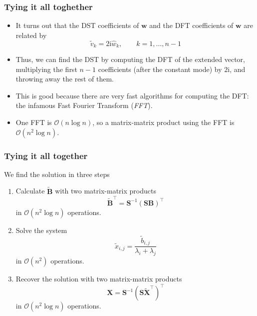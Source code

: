 \begin{frame}
  \frametitle{Tying it all toghether}
  \begin{itemize}
  \item It turns out that the DST coefficients of $\bm w$ and the DFT
    coefficients of $\bm w$ are related by
    \[
      \tilde{v}_k = 2\text{i}\hat{w}_k, \qquad
      k=1,\ldots,n-1
    \]
  \item Thus, we can find the DST by computing the DFT of the extended vector,
    multiplying the first $n-1$ coefficients (after the constant mode) by
    $2\text{i}$, and throwing away the rest of them.
  \item This is good because there are very fast algorithms for computing the
    DFT: the infamous Fast Fourier Transform (\emph{FFT}).
  \item One FFT is $\mathcal{O}(n \log n)$, so a matrix-matrix product using the
    FFT is $\mathcal{O}(n^2 \log n)$.
  \end{itemize}
\end{frame}

\begin{frame}
  \frametitle{Tying it all together}
  We find the solution in three steps
  \begin{enumerate}
  \item Calculate $\tilde{\bm B}$ with two matrix-matrix products
    \[ \tilde{\bm B}^\intercal = \bm S^{-1} (\bm S \bm B)^\intercal \]
    in $\mathcal{O}(n^2 \log n)$ operations.
  \item Solve the system
    \[ \tilde{x}_{i,j} = \frac{\tilde{b}_{i,j}}{\lambda_i + \lambda_j} \]
    in $\mathcal{O}(n^2)$ operations.
  \item Recover the solution with two matrix-matrix products\
    \[ \bm X = \bm S^{-1} (\bm S \tilde{\bm X}^\intercal)^\intercal \]
    in $\mathcal{O}(n^2 \log n)$ operations.
  \end{enumerate}
\end{frame}


